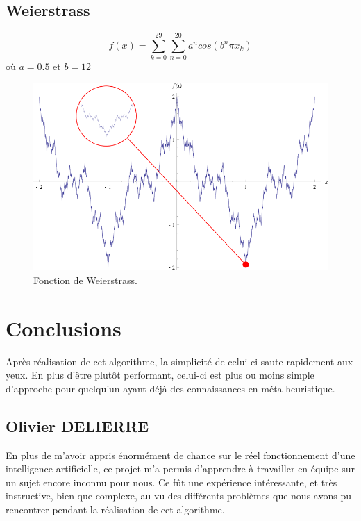 \documentclass[a4paper, fontsize=11pt]{article}
\begin{document}
\subsection{Weierstrass}
\begin{equation}
f(x) = \sum_{k=0}^{29} \sum_{n=0}^{20} a^n cos(b^n \pi x_k)
\end{equation}
où $a = 0.5$ et $b = 12$

\begin{figure}[b]
\centering
\includegraphics[width=1\textwidth]{weier.png}
\caption{\label{fig:frog}Fonction de Weierstrass.}
\end{figure}

\newpage

\section{Conclusions}
Après réalisation de cet algorithme, la simplicité de celui-ci saute rapidement aux yeux. En plus d'être plutôt performant, celui-ci est plus ou moins simple d'approche pour quelqu'un ayant déjà des connaissances en méta-heuristique.

\subsection{Olivier DELIERRE}
En plus de m'avoir appris énormément de chance sur le réel fonctionnement d'une intelligence artificielle, ce projet m'a permis d'apprendre à travailler en équipe sur un sujet encore inconnu pour nous. Ce fût une expérience intéressante, et très instructive, bien que complexe, au vu des différents problèmes que nous avons pu rencontrer pendant la réalisation de cet algorithme.
\end{document}
